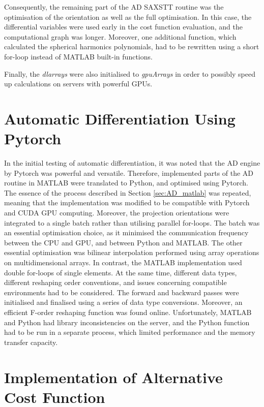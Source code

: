Consequently, the remaining part of the AD SAXSTT routine was the optimisation of the orientation as well as the full optimisation.
In this case, the differential variables were used early in the cost function evaluation, and the computational graph was longer.
Moreover, one additional function, which calculated the spherical harmonics polynomials, had to be rewritten using a short for-loop instead of MATLAB built-in functions.

Finally, the \emph{dlarrays} were also initialised to \emph{gpuArrays} in order to possibly speed up calculations on servers with powerful GPUs.


\section{Automatic Differentiation Using Pytorch}\label{sec:AD_pytorch}

In the initial testing of automatic differentiation, it was noted that the AD engine by Pytorch was powerful and versatile.
Therefore, implemented parts of the AD routine in MATLAB were translated to Python, and optimised using Pytorch.
The essence of the process described in Section \ref{sec:AD_matlab} was repeated,
meaning that the implementation was modified to be compatible with Pytorch and CUDA GPU computing.
Moreover, the projection orientations were integrated to a single batch rather than utilising parallel for-loops.
The batch was an essential optimisation choice, as it minimised the communication frequency between the CPU and GPU, and between Python and MATLAB.
The other essential optimisation was bilinear interpolation performed using array operations on multidimensional arrays.
In contrast, the MATLAB implementation used double for-loops of single elements.
At the same time, different data types, different reshaping order conventions, and issues concerning compatible environments had to be considered.
The forward and backward passes were initialised and finalised using a series of data type conversions.
Moreover, an efficient F-order reshaping function was found online.
Unfortunately, MATLAB and Python had library inconsistencies on the server,
and the Python function had to be run in a separate process, which limited performance and the memory transfer capacity.

\section{Implementation of Alternative Cost Function}\label{sec:alternative_cost_function}

